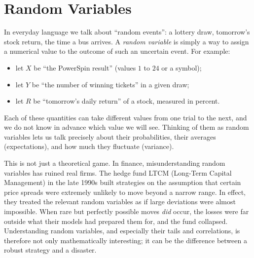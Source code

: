 \chapter{Random Variables}

In everyday language we talk about ``random events'': a lottery draw, tomorrow's stock return, the time a bus arrives.  A \emph{random variable} is simply a way to assign a numerical value to the outcome of such an uncertain event.  For example:
\begin{itemize}
  \item let $X$ be ``the PowerSpin result'' (values $1$ to $24$ or a symbol);
  \item let $Y$ be ``the number of winning tickets'' in a given draw;
  \item let $R$ be ``tomorrow's daily return'' of a stock, measured in percent.
\end{itemize}
Each of these quantities can take different values from one trial to the next, and we do not know in advance which value we will see.  Thinking of them as random variables lets us talk precisely about their probabilities, their averages (expectations), and how much they fluctuate (variance).

This is not just a theoretical game.  In finance, misunderstanding random variables has ruined real firms.  The hedge fund LTCM (Long-Term Capital Management) in the late 1990s built strategies on the assumption that certain price spreads were extremely unlikely to move beyond a narrow range.  In effect, they treated the relevant random variables as if large deviations were almost impossible.  When rare but perfectly possible moves \emph{did} occur, the losses were far outside what their models had prepared them for, and the fund collapsed.  Understanding random variables, and especially their tails and correlations, is therefore not only mathematically interesting; it can be the difference between a robust strategy and a disaster.